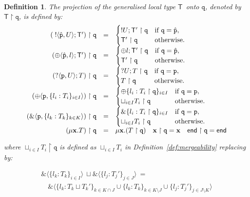 \documentclass{LMCS}
\newcommand{\ptilde}[1]{{\ensuremath{#1}}}
\newcommand{\kf}[1]{\textup{\textsf{#1}}\xspace}
\newcommand{\participant}[1]{\ensuremath{\mathtt{#1}}}
\newcommand{\q}{\ensuremath{\participant{q}}}
\newcommand{\p}{\ensuremath{\participant{p}}}
\newcommand{\at}[1]{\ensuremath{\ptilde{#1}}}
\newcommand{\pro}[2]{\ensuremath{#1\upharpoonright#2}}
\newcommand{\T}{\ensuremath{T}}
\newcommand{\TG}{\ensuremath{{\mathsf{T}}}}
\newcommand{\UT}{\ensuremath{U}}
\newcommand{\oT}[2]{\ensuremath{\;!\langle #2,#1\rangle}}
\newcommand{\iT}[2]{\ensuremath{? \langle #2,#1 \rangle}}
\newcommand{\End}{\kf{end}}
\newcommand{\seltype}{\ensuremath{\oplus \langle \p,\{l_i:\T_i\}_{i\in
I} \rangle }}
\newcommand{\seltypeT}{\ensuremath{\oplus\{l_i:\pro{\T_i}\q\}_{i\in I}}}
\newcommand{\seltypes}{\ensuremath{\oplus\langle\pv,l\rangle}}
\newcommand{\branchtype}{\ensuremath{\&\langle\p,\{l_k:\T_k\}_{k\in K}\rangle}}
\newcommand{\branchtypeT}{\ensuremath{\&\{l_i:\pro{\T_i}\q\}_{i\in I}}}
\newcommand{\pv}{\ensuremath{\at{\hat{\p}}}}
\newcommand{\xx}{\ensuremath{\mathbf{x}}}
\newtheorem{DEFINITION}[DUM]{Definition}{}{}
\newcommand{\mergecup}{\ensuremath{\sqcup}}
\begin{document}
\begin{DEFINITION}\label{def:genproj} 
\rm 
The {\em projection
of the generalised local type \TG\ onto \q}, denoted by $\pro\TG\q$,
is defined by:
\[
\begin{array}{rcl}
\pro{(\oT\UT{\pv};\TG')}\q&=&\begin{cases}
  !\UT;\pro{\TG'}\q  & \text{if }\q = \pv, \\
   \pro{\TG'}\q & \text{otherwise}.
\end{cases}\\
\pro{(\seltypes;\TG')}\q&=&\begin{cases}
  \oplus l;\pro{\TG'}\q  & \text{if }\q=\pv, \\
   \pro{\TG'}\q & \text{otherwise}.
\end{cases}\\
\pro{(\iT\UT{\p};\T)}\q&=&\begin{cases}
  ?\UT;\pro{\T}\q  & \text{if }\q=\p, \\
   \pro{\T}\q & \text{otherwise.}
\end{cases}\\
\pro{(\seltype)}\q&=&\begin{cases}
  \seltypeT  & \text{if }\q = \p, \\
  \sqcup_{i\in I}\pro{\T_i}\q & \text{otherwise.}
\end{cases}\\
\pro{(\branchtype)}\q&=&\begin{cases}
  \branchtypeT  & \text{if }\q=\p, \\
\sqcup_{i\in I}\pro{\T_i}\q 
&  \text{otherwise.}
\end{cases}\\
\pro{(\mu \xx.\T)}\q&=& \mu \xx.(\pro{\T}\q) \quad
\pro\xx\q=\xx\quad\pro\End\q=
         \End\\
       \end{array}
       \]

\noindent where $\sqcup_{i\in I}\pro{\T_i}\q$ is defined as $\sqcup_{i\in I}
T_i$ in Definition~\ref{def:mergeability} replacing by:  

\[ 
\begin{array}{lll}
\&\langle\{l_k:T_k\}_{i\in I}\rangle \ \mergecup 
\&\langle\{l_j:T_j'\}_{j\in J}\rangle \ = \\ 
\quad \&\langle\{l_k:T_k\mergecup T_k'\}_{k\in K\cap J}
\cup \{l_k:T_k\}_{k\in K\setminus J}
\cup \{l_j:T_j'\}_{j\in J\setminus K}\rangle\\[1mm]
\end{array}
\]
\end{DEFINITION}
\end{document}
